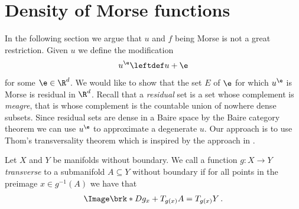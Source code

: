 \section{Density of Morse functions}\label{se:assuming_nonDegeneracy}

In the following section we argue that 
$u$ and $f$ being Morse is not a great restriction.
Given $u$ we define the modification
\begin{align}
  u^\e\leftdef u+\e\label{eq:nonDegeneracy:definitionUEps}
\end{align}
for some $\e\in\R^d$. We would like to show that the set $E$ of $\e$ for which $u^\e$ is Morse
is residual in $\R^d$.
Recall that a \emph{residual} set is a set whose complement is \emph{meagre}, that is whose complement
is the countable union of nowhere dense subsets.
Since residual sets are dense in a Baire space by the Baire category theorem we can 
use $u^\e$ to approximate a degenerate $u$.
Our approach is to use Thom's transversality theorem which is inspired by the approach in \cite[Chapter 6]{Hirsch1994}.
\begin{definition}
  Let $X$ and $Y$ be manifolds without boundary.
  We call a function $g\colon X\to Y$
  \emph{transverse} to a submanifold $A\subseteq Y$ without boundary if for all points in the 
  preimage $x\in g^{-1}(A)$ we have that
  \begin{align}
    \Image\brk*{Dg_x}+T_{g(x)}A = T_{g(x)}Y\,.\label{eq:nonDegeneracy_defTransversality}
  \end{align}
\end{definition}
